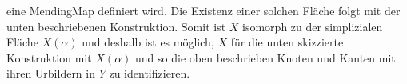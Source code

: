 \documentclass[12pt,titlepage]{article}
\begin{document}
eine MendingMap definiert wird. Die Existenz einer solchen Fläche folgt mit der unten beschriebenen Konstruktion. Somit ist $X$ isomorph zu der simplizialen Fläche $X(\alpha)$ und deshalb ist es möglich, $X$ für die unten skizzierte Konstruktion mit $X(\alpha)$ und so die oben beschrieben Knoten und Kanten  mit ihren Urbildern in $Y$ zu identifizieren. \\
\begin{comment}
\definecolor{ttqqqq}{rgb}{0.2,0.,0.}
\definecolor{sqsqsq}{rgb}{0.12549019607843137,0.12549019607843137,0.12549019607843137}
\definecolor{ffffqq}{rgb}{1.,1.,0.}
\definecolor{qqqqff}{rgb}{0.,0.,1.}
\begin{tikzpicture}[line cap=round,line join=round,>=triangle 45,x=1.0cm,y=1.0cm]
x=1.0cm,y=1.0cm,
axis lines=middle,
ymajorgrids=true,
xmajorgrids=true,
xmin=-5.056290110700678,
xmax=5.380866801866215,
ymin=-0.9227448489396118,
ymax=4.359364127681193,
xtick={-5.0,-4.5,...,5.0},
ytick={-0.5,0.0,...,4.0},]
\clip(-5.056290110700678,-0.9227448489396118) rectangle (5.380866801866215,4.359364127681193);
\fill[line width=2.pt,color=ffffqq,fill=ffffqq,fill opacity=0.5] (-2.,0.) -- (2.,0.) -- (0.,3.4641016151377553) -- cycle;
\fill[line width=2.pt,color=ffffqq,fill=ffffqq,fill opacity=0.5] (0.,3.4641016151377553) -- (2.,0.) -- (4.,3.464101615137754) -- cycle;
\draw [line width=2.pt,color=sqsqsq] (-2.,0.)-- (2.,0.);
\draw [line width=2.pt] (2.,0.)-- (0.,3.4641016151377553);
\draw [line width=2.pt] (0.,3.4641016151377553)-- (-2.,0.);
\draw [line width=2.pt,color=ttqqqq] (0.,3.4641016151377553)-- (2.,0.);
\draw [line width=2.pt] (2.,0.)-- (4.,3.464101615137754);
\draw [line width=2.pt,color=sqsqsq] (4.,3.464101615137754)-- (0.,3.4641016151377553);
\begin{scriptsize}
\draw [fill=qqqqff] (-2.,0.) circle (2.5pt);
\draw[color=qqqqff] (-2.0204388174366557,-0.2934108260899206) node {$\{V_4\}$};
\draw [fill=qqqqff] (2.,0.) circle (2.5pt);
\draw[color=qqqqff] (2.217954467927465,-0.2934108260899206) node {$\{V_2\}$};
\draw[color=black] (0.05337888214728793,1.23275494822094) node {$F'$};
\draw[color=sqsqsq] (0.062454670766911316,-0.24676492196181318) node {\{g\}};
\draw[color=black] (1.4829819149221139,1.9089012003828816) node {$\{e_3^1,e_3^2\}$};
\draw[color=black] (-1.4837010042626223,1.9678938264104335) node {$\{f^1,f^2\}$};
\draw [fill=qqqqff] (0.,3.4641016151377553) circle (2.5pt);
\draw[color=qqqqff] (0.11237150817483993,3.75145261535057) node {$\{V_1\}$};
\draw[color=black] (2.0228250126055625,2.3944558915327323) node {F};
\draw[color=black] (3.6250343543373756,1.7636885824689075) node {$\{e_1^1,e_1^2\}$};
\draw[color=sqsqsq] (2.2633334110255823,3.7603620787860503) node {$\{e_2^1,e_2^2\}$};
\draw [fill=qqqqff] (4.,3.464101615137754) circle (2.5pt);
\draw[color=qqqqff] (4.114794289428753,3.75145261535057) node {$\{V_3\}$};
\end{scriptsize}

\end{tikzpicture}
\end{comment}
\end{document}
